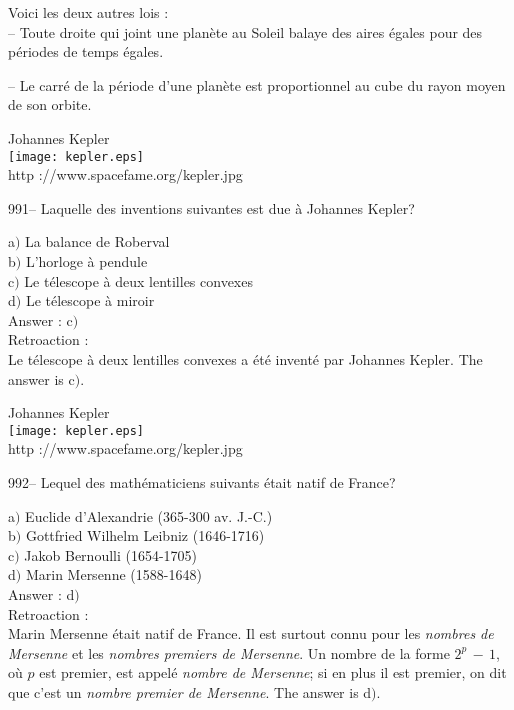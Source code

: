 ﻿\documentclass[letterpaper, 12pt]{article}
\begin{document}
Voici les deux autres lois :\\
-- Toute droite qui joint une plan\`ete au Soleil balaye des aires \'egales
pour des p\'eriodes de temps \'egales.

-- Le carr\'e de la p\'eriode d'une plan\`ete est proportionnel au
cube du rayon moyen de son orbite.
\\

        \begin{center}
        Johannes Kepler\\
    \texttt{[image: kepler.eps]}\\
        {\footnotesize http ://www.spacefame.org/kepler.jpg}
    \end{center}

991-- Laquelle des inventions suivantes est due \`a Johannes Kepler?

a$)$ La balance de Roberval \\
b$)$ L'horloge \`a pendule \\
c$)$ Le t\'elescope \`a deux lentilles convexes \\
d$)$ Le t\'elescope \`a miroir\\

Answer : c$)$\\

Retroaction : \\
Le t\'elescope \`a deux lentilles convexes a \'et\'e invent\'e par
Johannes Kepler.
The answer is c$)$.\\

        \begin{center}
        Johannes Kepler\\
    \texttt{[image: kepler.eps]}\\
        {\footnotesize http ://www.spacefame.org/kepler.jpg}
    \end{center}

992-- Lequel des math\'ematiciens suivants \'etait natif de France?

a$)$ Euclide d'Alexandrie (365-300 av. J.-C.) \\
b$)$ Gottfried Wilhelm Leibniz (1646-1716) \\
c$)$ Jakob Bernoulli (1654-1705) \\
d$)$ Marin Mersenne (1588-1648)\\

Answer : d$)$\\

Retroaction : \\
Marin Mersenne \'etait natif de France. Il est surtout connu pour
les {\sl nombres de Mersenne} et les {\sl nombres premiers de
Mersenne}. Un nombre de la forme $2^p\,-\,1$, o\`u $p$ est premier,
est appel\'e {\sl nombre de Mersenne}; si en plus il est premier, on
dit que c'est un {\sl nombre premier de Mersenne}.
The answer is d$)$.\\
\end{document}
